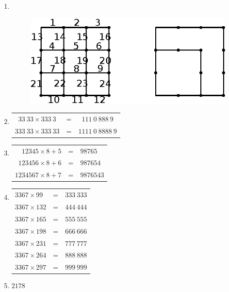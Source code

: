 \begin{enumerate}
\item
~

\phantom{a}

\vskip -1.3cm

\begin{figure}[H]
\centering
{}
\includegraphics{images/chap3/ans16.eps}
\end{figure}


\eject

\item 
\begin{tabular}[t]{ccc}
$33~33 \times 333~3$ & = & $111~0~888~9$\\
$333~33 \times 333~33$ & = & $1111~0~8888~9$
\end{tabular}

\smallskip
\item 
\begin{tabular}[t]{rrl}
$12345 \times 8 + 5$ & = & $98765$\\
$123456 \times 8 + 6$ & = & $987654$\\
$1234567 \times 8 + 7$ & = & $9876543$
\end{tabular}

\smallskip
\item
\begin{tabular}[t]{lll}
$3367 \times 99$ & = & $333~333$\\
$3367 \times 132$ & = & $444~444$\\
$3367 \times 165$ & = & $555~555$\\
$3367 \times 198$ & = & $666~666$\\
$3367 \times 231$ & = & $777~777$\\
$3367 \times 264$ & = & $888~888$\\
$3367 \times 297$ & = & $999~999$
\end{tabular}

\item $2178$


\end{enumerate}
